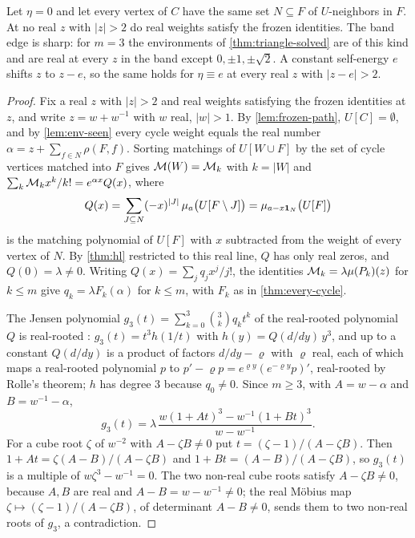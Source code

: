 \begin{theorem}\label{thm:meanfield}
Let $\eta=0$ and let every vertex of $C$ have the same set $N\subseteq F$ of $U$-neighbors in $F$. At no real $z$ with $|z|>2$ do real weights satisfy the frozen identities. The band edge is sharp: for $m=3$ the environments of \cref{thm:triangle-solved} are of this kind and are real at every $z$ in the band except $0,\pm1,\pm\sqrt2$. A constant self-energy $e$ shifts $z$ to $z-e$, so the same holds for $\eta\equiv e$ at every real $z$ with $|z-e|>2$.
\end{theorem}
\begin{proof}
Fix a real $z$ with $|z|>2$ and real weights satisfying the frozen identities at $z$, and write $z=w+w^{-1}$ with $w$ real, $|w|>1$. By \cref{lem:frozen-path}, $U[C]=\emptyset$, and by \cref{lem:env-seen} every cycle weight equals the real number $\alpha=z+\sum_{f\in N}\rho(F,f)$. Sorting matchings of $U[W\cup F]$ by the set of cycle vertices matched into $F$ gives $\mathcal{M}(W)=\mathcal{M}_k$ with $k=|W|$ and $\sum_k\mathcal{M}_kx^{k}/k!=e^{\alpha x}Q(x)$, where
\[
Q(x)=\sum_{J\subseteq N}(-x)^{|J|}\,\mu_a\bigl(U[F\setminus J]\bigr)=\mu_{a-x\mathbf{1}_N}\bigl(U[F]\bigr)
\]
is the matching polynomial of $U[F]$ with $x$ subtracted from the weight of every vertex of $N$. By \cref{thm:hl} restricted to this real line, $Q$ has only real zeros, and $Q(0)=\lambda\neq0$. Writing $Q(x)=\sum_jq_jx^{j}/j!$, the identities $\mathcal{M}_k=\lambda\mu(P_k)(z)$ for $k\le m$ give $q_k=\lambda F_k(\alpha)$ for $k\le m$, with $F_k$ as in \cref{thm:every-cycle}.

The Jensen polynomial $g_3(t)=\sum_{k=0}^{3}\binom3kq_kt^{k}$ of the real-rooted polynomial $Q$ is real-rooted \cite{PolyaSchur}: $g_3(t)=t^{3}h(1/t)$ with $h(y)=Q(d/dy)\,y^{3}$, and up to a constant $Q(d/dy)$ is a product of factors $d/dy-\varrho$ with $\varrho$ real, each of which maps a real-rooted polynomial $p$ to $p'-\varrho p=e^{\varrho y}(e^{-\varrho y}p)'$, real-rooted by Rolle's theorem; $h$ has degree $3$ because $q_0\neq0$. Since $m\ge3$, with $A=w-\alpha$ and $B=w^{-1}-\alpha$,
\[
g_3(t)=\lambda\,\frac{w(1+At)^{3}-w^{-1}(1+Bt)^{3}}{w-w^{-1}}.
\]
For a cube root $\zeta$ of $w^{-2}$ with $A-\zeta B\neq0$ put $t=(\zeta-1)/(A-\zeta B)$. Then $1+At=\zeta(A-B)/(A-\zeta B)$ and $1+Bt=(A-B)/(A-\zeta B)$, so $g_3(t)$ is a multiple of $w\zeta^{3}-w^{-1}=0$. The two non-real cube roots satisfy $A-\zeta B\neq0$, because $A,B$ are real and $A-B=w-w^{-1}\neq0$; the real M\"obius map $\zeta\mapsto(\zeta-1)/(A-\zeta B)$, of determinant $A-B\neq0$, sends them to two non-real roots of $g_3$, a contradiction.
\end{proof}

